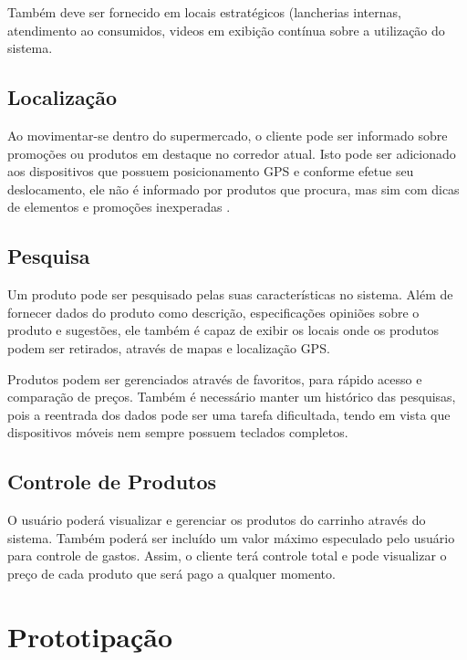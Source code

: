 \documentclass{article}
\begin{document}
Também deve ser fornecido em locais estratégicos (lancherias internas,
atendimento ao consumidos, videos em exibição contínua sobre a utilização do
sistema.

\subsection{Localização}


Ao movimentar-se dentro do supermercado, o cliente pode ser informado sobre
promoções ou produtos em destaque no corredor atual. Isto pode ser adicionado
aos dispositivos que possuem posicionamento GPS e conforme efetue seu
deslocamento, ele não é informado por produtos que procura, mas sim com dicas de
elementos e promoções inexperadas \cite{canny2006}.

\subsection{Pesquisa}


Um produto pode ser pesquisado pelas suas características no sistema. Além de
fornecer dados do produto como descrição, especificações opiniões sobre o
produto e sugestões, ele também é capaz de exibir os locais onde os produtos
podem ser retirados, através de mapas e localização GPS.


Produtos podem ser gerenciados através de favoritos, para rápido acesso e
comparação de preços. Também é necessário manter um histórico das pesquisas,
pois a reentrada dos dados pode ser uma tarefa dificultada, tendo em vista que
dispositivos móveis nem sempre possuem teclados completos.

\subsection{Controle de Produtos}


O usuário poderá visualizar e gerenciar os produtos do carrinho através do
sistema. Também poderá ser incluído um valor máximo especulado pelo usuário para
controle de gastos. Assim, o cliente terá controle total e pode visualizar o
preço de cada produto que será pago a qualquer momento.

\section{Prototipação}
\label{sec:prototipacao}
\end{document}
